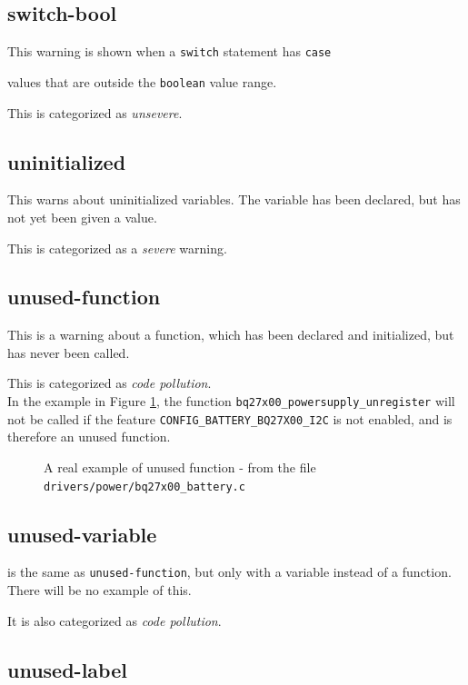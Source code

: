 \documentclass[a4paper,11pt]{report}
\newcommand{\textcode}[1]{
    \fboxsep=1pt
    \texttt{\colorbox{gray!20}{#1}}
}
\newcommand{\figa}{
    \begin{figure}[!htpb]
    \centering
}
\newcommand{\figb}[2]{
    \caption{#1}
    \label{#2}
    \end{figure}
}
\begin{document}
            \subsection*{switch-bool}
This warning is shown when a \textcode{switch} statement has \textcode{case}
values that are outside the \texttt{boolean} value range.

This is categorized as \emph{unsevere}.


            \subsection*{uninitialized}
This warns about uninitialized variables. The variable has been declared, but 
has not yet been given a value.

This is categorized as a \emph{severe} warning.


            \subsection*{unused-function}
This is a warning about a function, which has been declared and initialized, 
but has never been called. 

This is categorized as \emph{code pollution}.
\\

In the example in Figure \ref{lst:unusedfuncreal}, the function 
\texttt{bq27x00\_powersupply\_unregister} will not be called if the feature 
\texttt{CONFIG\_BATTERY\_BQ27X00\_I2C} is not enabled, and is therefore an 
unused function.

\figa
    
\figb{A real example of unused function - from the file 
    \texttt{drivers/power/bq27x00\_battery.c}}{lst:unusedfuncreal}


            \subsection*{unused-variable}
is the same as \texttt{unused-function}, but only with a variable instead of a 
function. There will be no example of this.

It is also categorized as \emph{code pollution}.


            \subsection*{unused-label}

\end{document}
